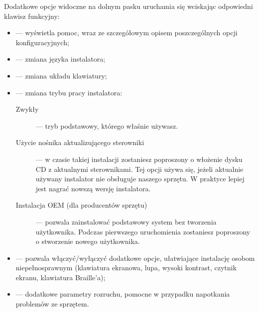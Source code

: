 Dodatkowe opcje widoczne na dolnym pasku uruchamia się wciskając odpowiedni klawisz funkcyjny:
\begin{itemize}
\item {} --- wyświetla pomoc, wraz ze szczegółowym opisem poszczególnych opcji konfiguracyjnych;
\item {} --- zmiana języka instalatora;
\item {} --- zmiana układu klawiatury;
\item {} --- zmiana trybu pracy instalatora:
        \begin{description}
        \item[\textcolor{ubuntu_orange}{Zwykły}] --- tryb podstawowy, którego właśnie używasz.
        \item[\textcolor{ubuntu_orange}{Użycie nośnika aktualizującego sterowniki}] --- w czasie takiej instalacji zostaniesz poproszony o włożenie dysku CD z aktualnymi sterownikami. Tej opcji używa się, jeżeli aktualnie używany instalator nie obsługuje naszego sprzętu. W praktyce lepiej jest nagrać nowszą wersję instalatora.
        \item[\textcolor{ubuntu_orange}{Instalacja OEM (dla producentów sprzętu)}] --- pozwala zainstalować podstawowy system \linebreak bez tworzenia użytkownika. Podczas pierwszego uruchomienia zostaniesz poproszony o stworzenie nowego użytkownika.
        \end{description}
\item {} --- pozwala włączyć/wyłączyć dodatkowe opcje, ułatwiające instalację osobom niepełnosprawnym (klawiatura ekranowa, lupa, wysoki kontrast, czytnik ekranu, klawiatura Braille'a);
\item {} --- dodatkowe parametry rozruchu, pomocne w przypadku napotkania problemów ze sprzętem.
\end{itemize}
